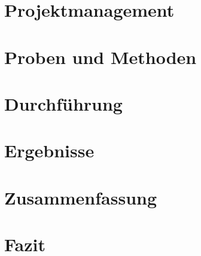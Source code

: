\documentclass[12pt,a4paper,ngerman,captions=tableheading]{scrartcl}
\begin{document}

\section{Projektmanagement}



\section{Proben und Methoden}



\section{Durchführung}




\section{Ergebnisse}




\section{Zusammenfassung}



\section{Fazit}

\newpage
\end{document}
